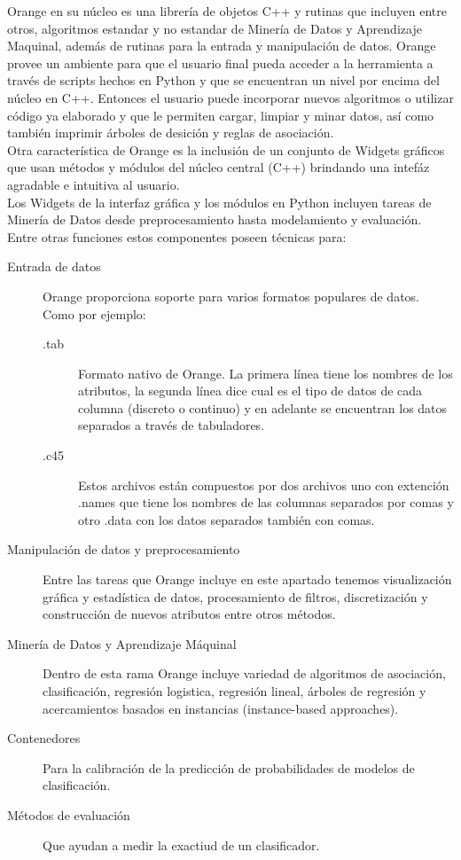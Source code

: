 Orange \cite{oranwp} en su n\'ucleo es una librer\'ia de objetos C++ y rutinas que incluyen entre otros,
algoritmos estandar y no estandar de Miner\'ia de Datos y Aprendizaje Maquinal, adem\'as de rutinas para la
entrada y manipulaci\'on de datos. Orange provee un ambiente para que el usuario final pueda acceder a la
herramienta a trav\'es de scripts hechos en Python y que se encuentran un nivel por encima del n\'ucleo en  C++.
Entonces el usuario puede incorporar nuevos algoritmos o utilizar c\'odigo ya elaborado y que le permiten cargar,
limpiar y minar datos, as\'i como tambi\'en imprimir \'arboles de desici\'on y reglas de asociaci\'on.\\

Otra caracter\'istica de Orange es la inclusi\'on de un conjunto de Widgets gr\'aficos que usan m\'etodos y
m\'odulos del n\'ucleo central (C++) brindando una intef\'az agradable e intuitiva al usuario.\\

Los Widgets de la interfaz gr\'afica y los m\'odulos en Python incluyen tareas de Miner\'ia de Datos desde 
preprocesamiento hasta modelamiento y evaluaci\'on. Entre otras funciones estos componentes poseen t\'ecnicas
para:

\begin{description}
\item [Entrada de datos] Orange proporciona soporte para varios formatos popu\-lares de datos. Como por ejemplo:
	\begin{description}
	\item  [.tab] Formato nativo de Orange. La primera l\'inea tiene los nombres de los atributos, la segunda
	l\'inea dice cual es el tipo de datos de cada columna (discreto o continuo) y en adelante se encuentran
	los datos separados a trav\'es de tabuladores.
	\item [.c45] Estos archivos est\'an compuestos por dos archivos uno con extenci\'on .names que tiene los
	nombres de las columnas separados por comas y otro .data con los datos separados tambi\'en con comas.
	\end{description}
	
\item [Manipulaci\'on de datos y preprocesamiento] Entre las tareas que Oran\-ge incluye en este apartado tenemos
visualizaci\'on gr\'afica y estad\'istica de datos, procesamiento de filtros, discretizaci\'on y construcci\'on
de nuevos atributos entre otros m\'etodos.

\item [Miner\'ia de Datos y Aprendizaje M\'aquinal] Dentro de esta rama Oran\-ge incluye variedad de algoritmos
de asociaci\'on, clasificaci\'on, regresi\'on logistica, regresi\'on lineal, \'arboles de regresi\'on y
acercamientos basados en instancias (instance-based approaches).

\item [Contenedores] Para la calibraci\'on de la predicci\'on de probabilidades de modelos de clasificaci\'on.

\item [M\'etodos de evaluaci\'on] Que ayudan a medir la exactiud de un clasificador.
\end{description}

